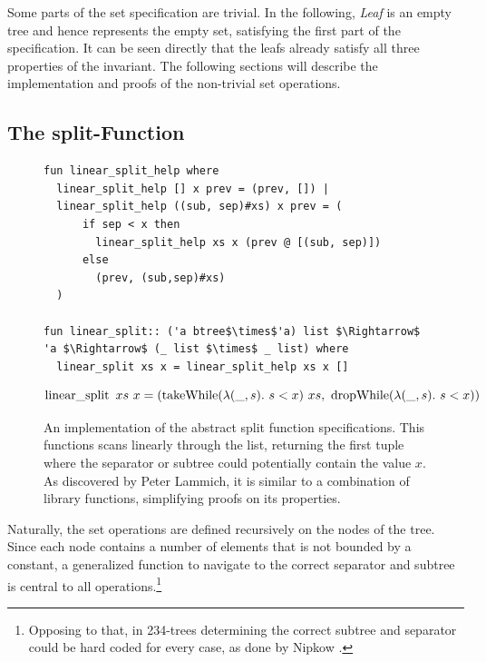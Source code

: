 Some parts of the set specification are trivial.
In the following, \textit{Leaf} is an empty tree and hence represents
the empty set, satisfying the first part of the specification.
It can be seen directly that the leafs already satisfy all three 
properties of the invariant.
The following sections will describe the implementation 
and proofs of the non-trivial set operations.

\subsection{The split-Function}

\begin{figure}
    
\begin{lstlisting}[mathescape=true, language=Isabelle]
fun linear_split_help where
  linear_split_help [] x prev = (prev, []) |
  linear_split_help ((sub, sep)#xs) x prev = (
      if sep < x then
        linear_split_help xs x (prev @ [(sub, sep)])
      else
        (prev, (sub,sep)#xs)
  )

fun linear_split:: ('a btree$\times$'a) list $\Rightarrow$ 'a $\Rightarrow$ (_ list $\times$ _ list) where
  linear_split xs x = linear_split_help xs x []
\end{lstlisting}
\begin{lemma}
    \begin{equation*}
    \operatorname{linear\_split}\ xs\ x = (\operatorname{takeWhile} (\lambda(\_,s).\ s < x)\ xs,\ \operatorname{dropWhile} (\lambda(\_,s).\ s < x))
    \end{equation*}
\end{lemma}
\caption[An implementation of the abstract split function specifications.]
{An implementation of the abstract split function specifications.
This functions scans linearly through the list, returning the first tuple where the separator
or subtree could potentially contain the value $x$.
As discovered by Peter Lammich,
it is similar to a combination of library functions, simplifying proofs on its properties.}
\label{fig:linear_split}

\end{figure}

Naturally, the set operations are defined recursively on the nodes of the tree.
Since each node contains a number of elements that is not bounded by a constant,
a generalized function to navigate to the correct separator and subtree
is central to all operations.\footnote{
    Opposing to that, in 234-trees determining the correct subtree
    and separator could be hard coded for every case, as done by Nipkow \parencite{DBLP:conf/itp/Nipkow16}.
}

